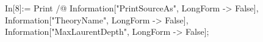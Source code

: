 In[8]:= Print /@ {Information["PrintSourceAs", LongForm -> False], Information["TheoryName", LongForm -> False], Information["MaxLaurentDepth", LongForm -> False]}; 